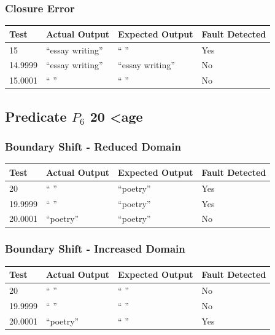 \documentclass[11pt, oneside]{article}   	%
\begin{document}
\subsubsection{Closure Error}
\begin{table}[!htb]
\centering
\begin{tabular}{|l|l|l|l|}
\hline
Test    & Actual Output   & Expected Output & Fault Detected \\ \hline
15      & “essay writing” & “ ”             & Yes            \\ \hline
14.9999 & “essay writing” & “essay writing” & No             \\ \hline
15.0001 & “ ”             & “ ”             & No             \\ \hline
\end{tabular}
\end{table}
\newpage

\subsection{Predicate $P_6$ 20 \textless age}
\subsubsection{Boundary Shift - Reduced Domain}
\begin{table}[!htb]
\centering
\begin{tabular}{|l|l|l|l|}
\hline
Test    & Actual Output & Expected Output & Fault Detected \\ \hline
20      & “ ”           & “poetry”        & Yes            \\ \hline
19.9999 & “ ”           & “poetry”        & Yes            \\ \hline
20.0001 & “poetry”      & “poetry”        & No             \\ \hline
\end{tabular}
\end{table}

\subsubsection{Boundary Shift - Increased Domain}
\begin{table}[!htb]
\centering
\begin{tabular}{|l|l|l|l|}
\hline
Test    & Actual Output & Expected Output & Fault Detected \\ \hline
20      & “ ”           & “ ”             & No             \\ \hline
19.9999 & “ ”           & “ ”             & No             \\ \hline
20.0001 & “poetry”      & “ ”             & Yes            \\ \hline
\end{tabular}
\end{table}
\end{document}
